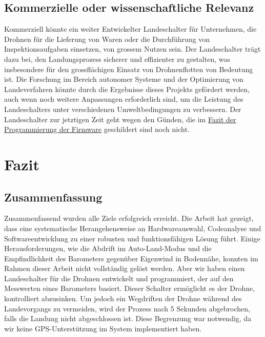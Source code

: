\subsection{Kommerzielle oder wissenschaftliche Relevanz}

Kommerziell könnte ein weiter Entwickelter Landeschalter für Unternehmen, die Drohnen für die Lieferung von Waren oder die Durchführung von Inspektionsaufgaben einsetzen, von grossem Nutzen sein. Der Landeschalter trägt dazu bei, den Landungsprozess sicherer und effizienter zu gestalten, was insbesondere für den grossflächigen Einsatz von Drohnenflotten von Bedeutung ist. 
Die Forschung im Bereich autonomer Systeme und der Optimierung von Landeverfahren könnte durch die Ergebnisse dieses Projekts gefördert werden, auch wenn noch weitere Anpassungen erforderlich sind, um die Leistung des Landeschalters unter verschiedenen Umweltbedingungen zu verbessern.
Der Landeschalter zur jetztigen Zeit geht wegen den Günden, die im \hyperref[sec:Fazit6]{Fazit der Programmierung der Firmware} geschildert sind noch nicht. 
\section{Fazit}

\subsection{Zusammenfassung}
Zusammenfassend wurden alle Ziele erfolgreich erreicht. Die Arbeit hat gezeigt, dass eine systematische Herangehensweise an Hardwareauswahl, Codeanalyse und Softwareentwicklung zu einer robusten und funktionsfähigen Lösung führt. Einige Herausforderungen, wie die Abdrift im Auto-Land-Modus und die Empfindlichkeit des Barometers gegenüber Eigenwind in Bodennähe, konnten im Rahmen dieser Arbeit nicht vollständig gelöst werden. Aber wir haben einen Landeschalter für die Drohnen entwickelt und programmiert, der auf den Messwerten eines Barometers basiert. Dieser Schalter ermöglicht es der Drohne, kontrolliert abzusinken. Um jedoch ein Wegdriften der Drohne während des Landevorgangs zu vermeiden, wird der Prozess nach 5 Sekunden abgebrochen, falls die Landung nicht abgeschlossen ist. Diese Begrenzung war notwendig, da wir keine GPS-Unterstützung im System implementiert haben. 




